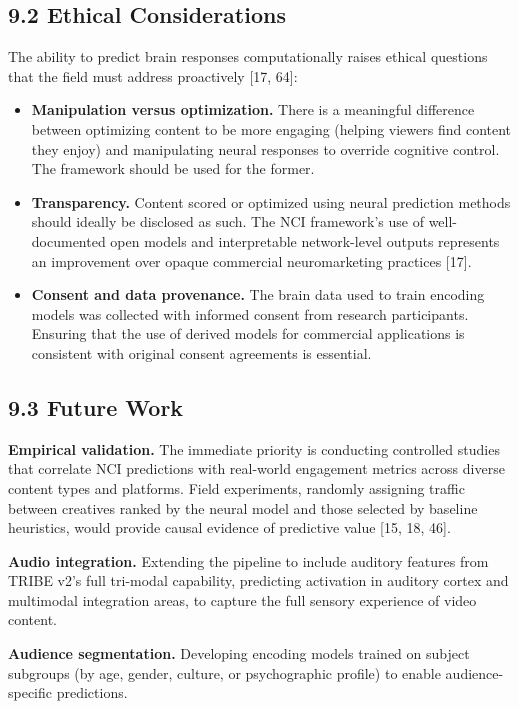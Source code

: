 \documentclass[11pt,letterpaper]{article}
\begin{document}
\subsection{9.2 Ethical Considerations}

The ability to predict brain responses computationally raises ethical questions that the field must address proactively [17, 64]:
\begin{itemize}
  \item \textbf{Manipulation versus optimization.} There is a meaningful difference between optimizing content to be more engaging (helping viewers find content they enjoy) and manipulating neural responses to override cognitive control. The framework should be used for the former.
  \item \textbf{Transparency.} Content scored or optimized using neural prediction methods should ideally be disclosed as such. The NCI framework's use of well-documented open models and interpretable network-level outputs represents an improvement over opaque commercial neuromarketing practices [17].
  \item \textbf{Consent and data provenance.} The brain data used to train encoding models was collected with informed consent from research participants. Ensuring that the use of derived models for commercial applications is consistent with original consent agreements is essential.
\end{itemize}
\subsection{9.3 Future Work}

\textbf{Empirical validation.} The immediate priority is conducting controlled studies that correlate NCI predictions with real-world engagement metrics across diverse content types and platforms. Field experiments, randomly assigning traffic between creatives ranked by the neural model and those selected by baseline heuristics, would provide causal evidence of predictive value [15, 18, 46].

\textbf{Audio integration.} Extending the pipeline to include auditory features from TRIBE v2's full tri-modal capability, predicting activation in auditory cortex and multimodal integration areas, to capture the full sensory experience of video content.

\textbf{Audience segmentation.} Developing encoding models trained on subject subgroups (by age, gender, culture, or psychographic profile) to enable audience-specific predictions.
\end{document}
